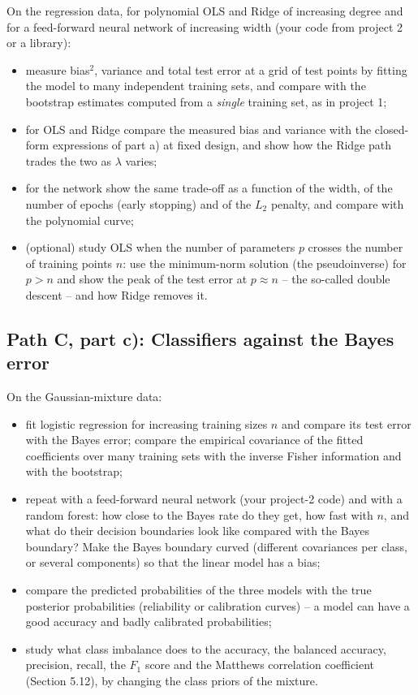 \documentclass[11pt,a4paper]{article}
\begin{document}
On the regression data, for polynomial OLS and Ridge of increasing degree
and for a feed-forward neural network of increasing width (your code from
project 2 or a library):
\begin{itemize}[nosep]
  \item measure bias$^2$, variance and total test error at a grid of test
        points by fitting the model to many independent training sets, and
        compare with the bootstrap estimates computed from a \emph{single}
        training set, as in project 1;
  \item for OLS and Ridge compare the measured bias and variance with the
        closed-form expressions of part a) at fixed design, and show how the
        Ridge path trades the two as $\lambda$ varies;
  \item for the network show the same trade-off as a function of the width,
        of the number of epochs (early stopping) and of the $L_2$ penalty,
        and compare with the polynomial curve;
  \item (optional) study OLS when the number of parameters $p$ crosses the
        number of training points $n$: use the minimum-norm solution
        (the pseudoinverse) for $p>n$ and show the peak of the test error at
        $p\approx n$ -- the so-called double descent -- and how Ridge removes
        it.
\end{itemize}

\subsection*{Path C, part c): Classifiers against the Bayes error}

On the Gaussian-mixture data:
\begin{itemize}[nosep]
  \item fit logistic regression for increasing training sizes $n$ and
        compare its test error with the Bayes error; compare the empirical
        covariance of the fitted coefficients over many training sets with
        the inverse Fisher information and with the bootstrap;
  \item repeat with a feed-forward neural network (your project-2 code) and
        with a random forest: how close to the Bayes rate do they get, how
        fast with $n$, and what do their decision boundaries look like
        compared with the Bayes boundary?  Make the Bayes boundary curved
        (different covariances per class, or several components) so that the
        linear model has a bias;
  \item compare the predicted probabilities of the three models with the
        true posterior probabilities (reliability or calibration curves) --
        a model can have a good accuracy and badly calibrated probabilities;
  \item study what class imbalance does to the accuracy, the balanced
        accuracy, precision, recall, the $F_1$ score and the Matthews
        correlation coefficient (Section 5.12), by changing the class priors
        of the mixture.
\end{itemize}
\end{document}
